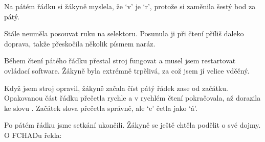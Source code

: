 Na pátém řádku si žákyně myslela, že `v' je `r', protože si zaměnila šestý bod za pátý.

Stále neuměla posouvat ruku na selektoru. Posunula ji při čtení příliš daleko doprava, takže přeskočila několik písmem naráz.

Během čtení pátého řádku přestal stroj fungovat a musel jsem restartovat ovládací software.  Žákyně byla extrémně trpělivá, za což jsem jí velice vděčný.

Když jsem stroj opravil, žákyně začala číst pátý řádek zase od začátku. Opakovanou část řádku přečetla rychle a v rychlém čtení pokračovala, až dorazila ke slovu .  Začátek slova přečetla správně, ale `e' četla jako `á'.

Po pátém řádku jsme setkání ukončili. Žákyně se ještě chtěla podělit o své dojmy.  O FCHADu řekla:

\em {} \em


